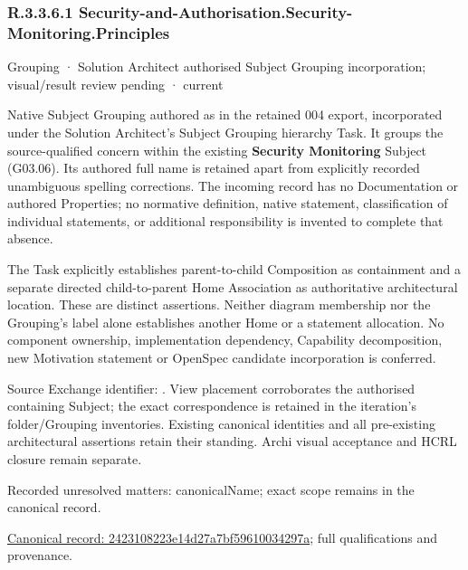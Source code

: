 \subsubsection*{R.3.3.6.1 Security-and-Authorisation.Security-Monitoring.Principles}
\label{navigation:R.3.3.6.1}

\label{element:2423108223e14d27a7bf59610034297a}
{\small Grouping · Solution Architect authorised Subject Grouping incorporation; visual/result review pending · current}\par

Native Subject Grouping authored as \texttt{} in the retained 004 export,
incorporated under the Solution Architect's Subject Grouping hierarchy Task.
It groups the source-qualified \texttt{} concern within
the existing \textbf{Security Monitoring} Subject (G03.06). Its authored full name
is retained apart from explicitly recorded unambiguous spelling corrections.
The incoming record has no Documentation or authored Properties; no normative
definition, native statement, classification of individual statements, or
additional responsibility is invented to complete that absence.



The Task explicitly establishes parent-to-child Composition as containment and
a separate directed child-to-parent Home Association as authoritative architectural
location. These are distinct assertions. Neither diagram membership nor the
Grouping's label alone establishes another Home or a statement allocation.
No component ownership, implementation dependency, Capability decomposition,
new Motivation statement or OpenSpec candidate incorporation is conferred.



Source Exchange identifier: \texttt{}. View placement corroborates
the authorised containing Subject; the exact correspondence is retained in the
iteration's folder/Grouping inventories. Existing canonical identities and all
pre-existing architectural assertions retain their standing. Archi visual
acceptance and HCRL closure remain separate.


{\small Recorded unresolved matters: canonicalName; exact scope remains in the canonical record.}\par
{\footnotesize \href{../../../../continuum/grouping/2423108223e14d27a7bf59610034297a.md}{Canonical record: 2423108223e14d27a7bf59610034297a}; full qualifications and provenance.}\par
